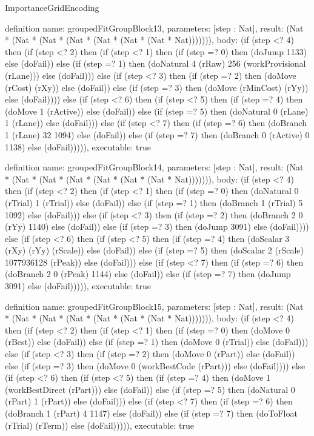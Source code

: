 \begin{lexlean}{ImportanceGridEncoding}
\begin{semanticmodule}
definition{
  name: groupedFitGroupBlock13,
  parameters: [step : Nat],
  result: (Nat * (Nat * (Nat * (Nat * (Nat * (Nat * (Nat * Nat))))))),
  body: (if (step <? 4) then
      (if (step <? 2) then
      (if (step <? 1) then
      (if (step =? 0) then (doJump 1133) else (doFail)) else
      (if (step =? 1) then (doNatural 4 (rRaw) 256 (workProvisional (rLane))) else (doFail))) else
      (if (step <? 3) then
      (if (step =? 2) then (doMove (rCost) (rXy)) else (doFail)) else
      (if (step =? 3) then (doMove (rMinCost) (rYy)) else (doFail)))) else
      (if (step <? 6) then
      (if (step <? 5) then
      (if (step =? 4) then (doMove 1 (rActive)) else (doFail)) else
      (if (step =? 5) then (doNatural 0 (rLane) 1 (rLane)) else (doFail))) else
      (if (step <? 7) then
      (if (step =? 6) then (doBranch 1 (rLane) 32 1094) else (doFail)) else
      (if (step =? 7) then (doBranch 0 (rActive) 0 1138) else (doFail))))),
  executable: true
}

definition{
  name: groupedFitGroupBlock14,
  parameters: [step : Nat],
  result: (Nat * (Nat * (Nat * (Nat * (Nat * (Nat * (Nat * Nat))))))),
  body: (if (step <? 4) then
      (if (step <? 2) then
      (if (step <? 1) then
      (if (step =? 0) then (doNatural 0 (rTrial) 1 (rTrial)) else (doFail)) else
      (if (step =? 1) then (doBranch 1 (rTrial) 5 1092) else (doFail))) else
      (if (step <? 3) then
      (if (step =? 2) then (doBranch 2 0 (rYy) 1140) else (doFail)) else
      (if (step =? 3) then (doJump 3091) else (doFail)))) else
      (if (step <? 6) then
      (if (step <? 5) then
      (if (step =? 4) then (doScalar 3 (rXy) (rYy) (rScale)) else (doFail)) else
      (if (step =? 5) then (doScalar 2 (rScale) 1077936128 (rPeak)) else (doFail))) else
      (if (step <? 7) then
      (if (step =? 6) then (doBranch 2 0 (rPeak) 1144) else (doFail)) else
      (if (step =? 7) then (doJump 3091) else (doFail))))),
  executable: true
}

definition{
  name: groupedFitGroupBlock15,
  parameters: [step : Nat],
  result: (Nat * (Nat * (Nat * (Nat * (Nat * (Nat * (Nat * Nat))))))),
  body: (if (step <? 4) then
      (if (step <? 2) then
      (if (step <? 1) then
      (if (step =? 0) then (doMove 0 (rBest)) else (doFail)) else
      (if (step =? 1) then (doMove 0 (rTrial)) else (doFail))) else
      (if (step <? 3) then
      (if (step =? 2) then (doMove 0 (rPart)) else (doFail)) else
      (if (step =? 3) then (doMove 0 (workBestCode (rPart))) else (doFail)))) else
      (if (step <? 6) then
      (if (step <? 5) then
      (if (step =? 4) then (doMove 1 (workBestDirect (rPart))) else (doFail)) else
      (if (step =? 5) then (doNatural 0 (rPart) 1 (rPart)) else (doFail))) else
      (if (step <? 7) then
      (if (step =? 6) then (doBranch 1 (rPart) 4 1147) else (doFail)) else
      (if (step =? 7) then (doToFloat (rTrial) (rTerm)) else (doFail))))),
  executable: true
}


\end{semanticmodule}
\end{lexlean}
